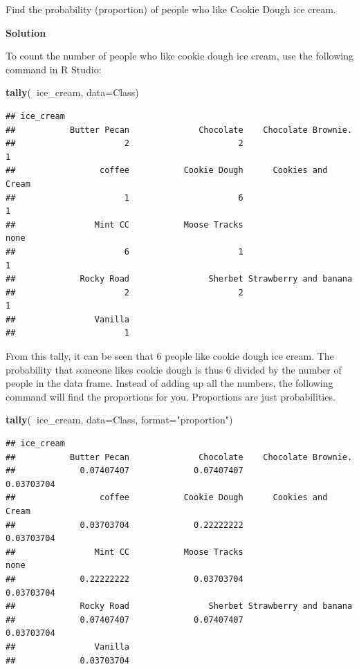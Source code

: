 \documentclass[
]{book}
\newenvironment{Shaded}{\begin{snugshade}}{\end{snugshade}}
\newcommand{\DataTypeTok}[1]{\textcolor[rgb]{0.13,0.29,0.53}{#1}}
\newcommand{\KeywordTok}[1]{\textcolor[rgb]{0.13,0.29,0.53}{\textbf{#1}}}
\newcommand{\NormalTok}[1]{#1}
\newcommand{\OperatorTok}[1]{\textcolor[rgb]{0.81,0.36,0.00}{\textbf{#1}}}
\newcommand{\StringTok}[1]{\textcolor[rgb]{0.31,0.60,0.02}{#1}}
\begin{document}
Find the probability (proportion) of people who like Cookie Dough ice cream.

\textbf{Solution}

To count the number of people who like cookie dough ice cream, use the following command in R Studio:

\begin{Shaded}
\begin{Highlighting}[]
\KeywordTok{tally}\NormalTok{(}\OperatorTok{~}\NormalTok{ice_cream, }\DataTypeTok{data=}\NormalTok{Class)}
\end{Highlighting}
\end{Shaded}

\begin{verbatim}
## ice_cream
##           Butter Pecan              Chocolate    Chocolate Brownie.  
##                      2                      2                      1 
##                 coffee           Cookie Dough      Cookies and Cream 
##                      1                      6                      1 
##                Mint CC           Moose Tracks                   none 
##                      6                      1                      1 
##             Rocky Road                Sherbet Strawberry and banana  
##                      2                      2                      1 
##                Vanilla 
##                      1
\end{verbatim}

From this tally, it can be seen that 6 people like cookie dough ice cream. The probability that someone likes cookie dough is thus 6 divided by the number of people in the data frame. Instead of adding up all the numbers, the following command will find the proportions for you. Proportions are just probabilities.

\begin{Shaded}
\begin{Highlighting}[]
\KeywordTok{tally}\NormalTok{(}\OperatorTok{~}\NormalTok{ice_cream, }\DataTypeTok{data=}\NormalTok{Class, }\DataTypeTok{format=}\StringTok{"proportion"}\NormalTok{)}
\end{Highlighting}
\end{Shaded}

\begin{verbatim}
## ice_cream
##           Butter Pecan              Chocolate    Chocolate Brownie.  
##             0.07407407             0.07407407             0.03703704 
##                 coffee           Cookie Dough      Cookies and Cream 
##             0.03703704             0.22222222             0.03703704 
##                Mint CC           Moose Tracks                   none 
##             0.22222222             0.03703704             0.03703704 
##             Rocky Road                Sherbet Strawberry and banana  
##             0.07407407             0.07407407             0.03703704 
##                Vanilla 
##             0.03703704
\end{verbatim}
\end{document}
